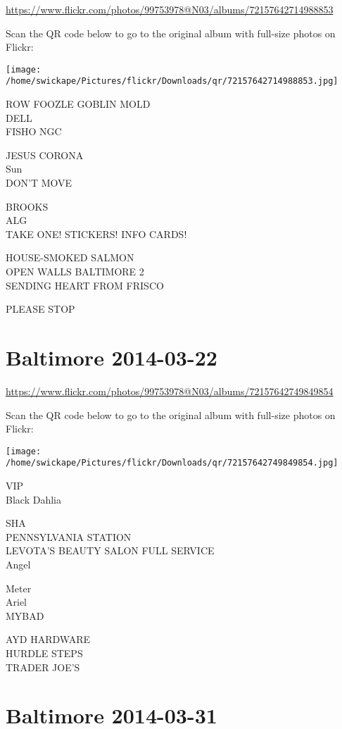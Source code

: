 \documentclass[10pt,letterpaper]{article}
\begin{document}
\url{https://www.flickr.com/photos/99753978@N03/albums/72157642714988853}

Scan the QR code below to go to the original album with full-size photos on Flickr:

\texttt{[image: /home/swickape/Pictures/flickr/Downloads/qr/72157642714988853.jpg]}
\pagebreak

ROW FOOZLE GOBLIN MOLD\\
DELL\\
FISHO NGC

JESUS CORONA\\
Sun\\
DON'T MOVE

BROOKS\\
ALG\\
TAKE ONE!  STICKERS!  INFO CARDS!

HOUSE{-}SMOKED SALMON\\
OPEN WALLS BALTIMORE 2\\
SENDING HEART FROM FRISCO

PLEASE STOP
\pagebreak

\section*{Baltimore 2014-03-22}

\url{https://www.flickr.com/photos/99753978@N03/albums/72157642749849854}

Scan the QR code below to go to the original album with full-size photos on Flickr:

\texttt{[image: /home/swickape/Pictures/flickr/Downloads/qr/72157642749849854.jpg]}
\pagebreak

VIP\\
Black Dahlia

SHA\\
PENNSYLVANIA STATION\\
LEVOTA'S BEAUTY SALON FULL SERVICE\\
Angel

Meter\\
Ariel\\
MYBAD

AYD HARDWARE\\
HURDLE STEPS\\
TRADER JOE'S
\pagebreak

\section*{Baltimore 2014-03-31}
\end{document}
